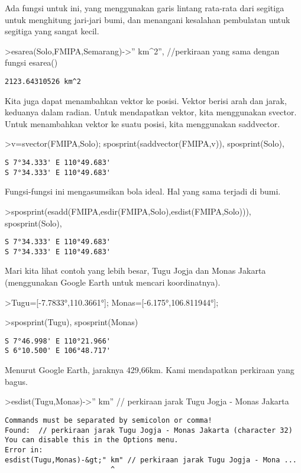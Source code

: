 \documentclass[
]{book}
\begin{document}
Ada fungsi untuk ini, yang menggunakan garis lintang rata-rata dari segitiga untuk menghitung jari-jari bumi, dan menangani kesalahan pembulatan untuk segitiga yang sangat kecil.

\textgreater esarea(Solo,FMIPA,Semarang)-\textgreater'' km\^{}2'', //perkiraan yang sama dengan fungsi esarea()

\begin{verbatim}
2123.64310526 km^2
\end{verbatim}

Kita juga dapat menambahkan vektor ke posisi. Vektor berisi arah dan jarak, keduanya dalam radian. Untuk mendapatkan vektor, kita menggunakan svector. Untuk menambahkan vektor ke suatu posisi, kita menggunakan saddvector.

\textgreater v=svector(FMIPA,Solo); sposprint(saddvector(FMIPA,v)), sposprint(Solo),

\begin{verbatim}
S 7°34.333' E 110°49.683'
S 7°34.333' E 110°49.683'
\end{verbatim}

Fungsi-fungsi ini mengasumsikan bola ideal. Hal yang sama terjadi di bumi.

\textgreater sposprint(esadd(FMIPA,esdir(FMIPA,Solo),esdist(FMIPA,Solo))), sposprint(Solo),

\begin{verbatim}
S 7°34.333' E 110°49.683'
S 7°34.333' E 110°49.683'
\end{verbatim}

Mari kita lihat contoh yang lebih besar, Tugu Jogja dan Monas Jakarta (menggunakan Google Earth untuk mencari koordinatnya).

\textgreater Tugu={[}-7.7833°,110.3661°{]}; Monas={[}-6.175°,106.811944°{]};

\textgreater sposprint(Tugu), sposprint(Monas)

\begin{verbatim}
S 7°46.998' E 110°21.966'
S 6°10.500' E 106°48.717'
\end{verbatim}

Menurut Google Earth, jaraknya 429,66km. Kami mendapatkan perkiraan yang bagus.

\textgreater esdist(Tugu,Monas)-\textgreater'' km'' // perkiraan jarak Tugu Jogja - Monas Jakarta

\begin{verbatim}
Commands must be separated by semicolon or comma!
Found:  // perkiraan jarak Tugu Jogja - Monas Jakarta (character 32)
You can disable this in the Options menu.
Error in:
esdist(Tugu,Monas)-&gt;" km" // perkiraan jarak Tugu Jogja - Mona ...
                         ^
\end{verbatim}
\end{document}
